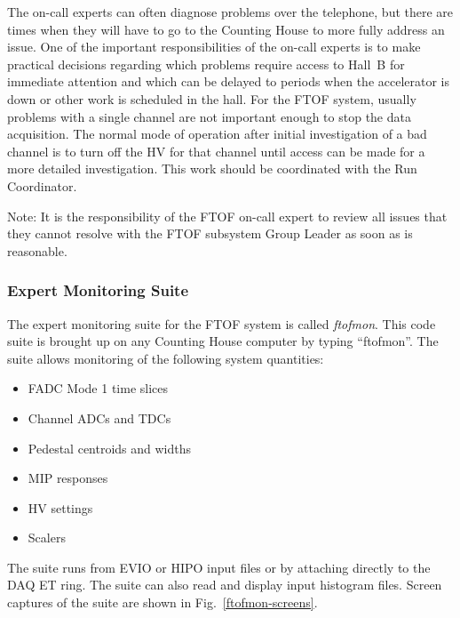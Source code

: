 \documentclass[12pt]{article}
\begin{document}
The on-call experts can often diagnose problems over the telephone, but there are times 
when they will have to go to the Counting House to more fully address an issue. One of 
the important responsibilities of the on-call experts is to make practical decisions 
regarding which problems require access to Hall~B for immediate attention and which can 
be delayed to periods when the accelerator is down or other work is scheduled in the 
hall. For the FTOF system, usually problems with a single channel are not important 
enough to stop the data acquisition. The normal mode of operation after initial 
investigation of a bad channel is to turn off the HV for that channel until access can 
be made for a more detailed investigation. This work should be coordinated with the Run 
Coordinator.

Note: It is the responsibility of the FTOF on-call expert to review all issues that 
they cannot resolve with the FTOF subsystem Group Leader as soon as is reasonable.

\subsubsection{Expert Monitoring Suite}
\label{ftofmon}

The expert monitoring suite for the FTOF system is called {\it ftofmon}. This code 
suite is brought up on any Counting House computer by typing ``ftofmon''. The suite
allows monitoring of the following system quantities:

\begin{itemize}
\item FADC Mode 1 time slices
\item Channel ADCs and TDCs
\item Pedestal centroids and widths
\item MIP responses
\item HV settings
\item Scalers
\end{itemize}

The suite runs from EVIO or HIPO input files or by attaching directly to the DAQ ET 
ring. The suite can also read and display input histogram files. Screen captures of 
the suite are shown in Fig.~\ref{ftofmon-screens}. 
\end{document}

